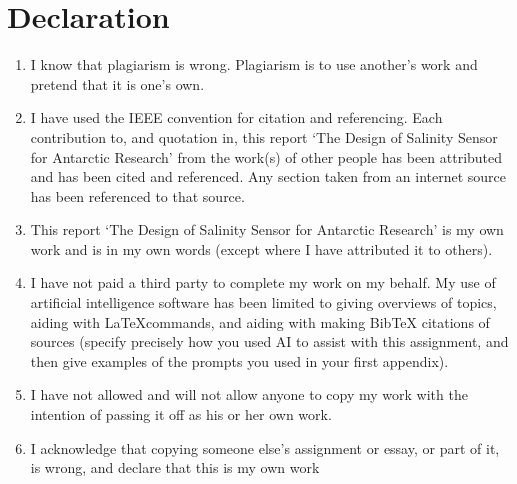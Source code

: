 {
\onehalfspacing
   
\chapter*{Declaration}

\vskip 10mm
\begin{enumerate}
    \item I know that plagiarism is wrong.
    Plagiarism is to use another’s work and pretend that it is one’s own.
    \item I have used the IEEE convention for citation and referencing.
    Each contribution to, and quotation in, this report `The Design of Salinity Sensor for Antarctic Research' from the work(s) of other people has been attributed and has been cited and referenced.
    Any section taken from an internet source has been referenced to that source.
    \item This report `The Design of Salinity Sensor for Antarctic Research' is my own work and is in my own words (except where I have attributed it to others).
    \item I have not paid a third party to complete my work on my behalf.
    My use of artificial intelligence software has been limited to giving overviews of topics, aiding with \LaTeX commands, and aiding with making BibTeX citations of sources (specify precisely how you used AI to assist with this assignment, and then give examples of the prompts you used in your first appendix).
    \item I have not allowed and will not allow anyone to copy my work with the intention of passing it off as his or her own work.
    \item I acknowledge that copying someone else’s assignment or essay, or part of it, is wrong, and declare that this is my own work
\end{enumerate}
\vskip 30mm

\par\noindent{}\hfill\makebox[2.0in]{\today}%
\par\noindent\makebox[2.5in]{\hrulefill} \hfill\makebox[2.0in]{\hrulefill}%
\par\noindent{}      \hfill{}%

}